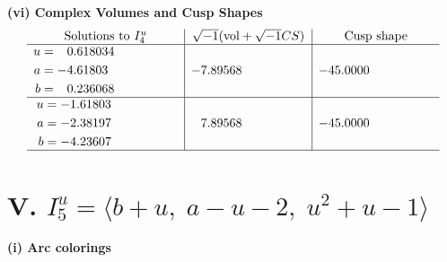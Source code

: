 \documentclass[1p]{elsarticle_modified}
\theoremstyle{definition}
\newcommand{\I}{\sqrt{-1}}
\begin{document}
\newpage\flushleft \textbf{(vi) Complex Volumes and Cusp Shapes}
$$\begin{array}{c|c|c}  
\text{Solutions to }I^u_{4}& \I (\text{vol} + \sqrt{-1}CS) & \text{Cusp shape}\\
 \hline 
\begin{aligned}
u &= \phantom{-}0.618034\phantom{ +0.000000I} \\
a &= -4.61803\phantom{ +0.000000I} \\
b &= \phantom{-}0.236068\phantom{ +0.000000I}\end{aligned}
 & -7.89568\phantom{ +0.000000I} & -45.0000\phantom{ +0.000000I} \\ \hline\begin{aligned}
u &= -1.61803\phantom{ +0.000000I} \\
a &= -2.38197\phantom{ +0.000000I} \\
b &= -4.23607\phantom{ +0.000000I}\end{aligned}
 & \phantom{-}7.89568\phantom{ +0.000000I} & -45.0000\phantom{ +0.000000I}\\
 \hline 
 \end{array}$$\newpage\newpage\renewcommand{\arraystretch}{1}
\centering \section*{V. $I^u_{5}= \langle b+u,\;a- u-2,\;u^2+u-1 \rangle$}
\flushleft \textbf{(i) Arc colorings}\\
\end{document}
